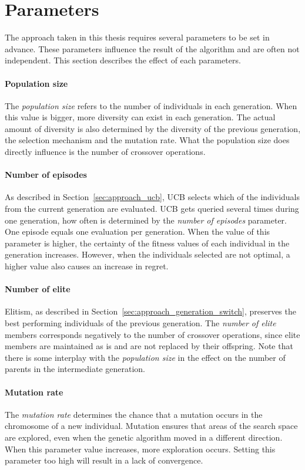 \section{Parameters}
The approach taken in this thesis requires several parameters to be set in
advance. These parameters influence the result of the algorithm and are often
not independent. This section describes the effect of each parameters.
\paragraph{Population size} The \emph{population size} refers to the number of individuals in each generation.
When this value is bigger, more diversity can exist in each generation.
The actual amount of diversity is also determined by the diversity of the
previous generation, the selection mechanism and the mutation rate.
What the population size does directly influence is the number of crossover
operations.

\paragraph{Number of episodes} As described in Section~\ref{sec:approach_ucb}, UCB selects which of the
individuals from the current generation are evaluated. UCB gets queried several
times during one generation, how often is determined by the \emph{number of
episodes} parameter. One episode equals one evaluation per generation. When
the value of this parameter is higher, the certainty of the fitness values of
each individual in the generation increases. However, when the individuals
selected are not optimal, a higher value also causes an increase in regret.
\paragraph{Number of elite} Elitism, as described in Section~\ref{sec:approach_generation_switch},
preserves the best performing individuals of the previous generation. The
\emph{number of elite} members corresponds negatively to the number of
crossover operations, since elite members are maintained as is and are not
replaced by their offspring. Note that there is some interplay with
the \emph{population size} in the effect on the number of parents in the
intermediate generation.
\paragraph{Mutation rate} The \emph{mutation rate} determines the chance that a mutation occurs in the
chromosome of a new individual. Mutation ensures that areas of the search space
are explored, even when the genetic algorithm moved in a different direction.
When this parameter value increases, more exploration occurs. Setting this
parameter too high will result in a lack of convergence.
